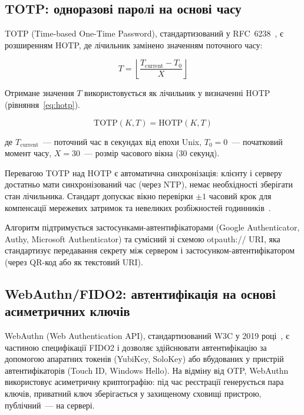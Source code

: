 \subsection{TOTP: одноразові паролі на основі часу}

TOTP (Time-based One-Time Password), стандартизований у RFC~6238~\cite{rfc6238},
є розширенням HOTP, де лічильник замінено значенням поточного часу:

\begin{equation}
T = \left\lfloor \frac{T_{\text{current}} - T_0}{X} \right\rfloor
\label{eq:totp_counter}
\end{equation}

Отримане значення $T$ використовується як лічильник у визначенні HOTP
(рівняння~\ref{eq:hotp}).

\begin{equation}
\text{TOTP}(K, T) = \text{HOTP}(K, T)
\label{eq:totp}
\end{equation}

де $T_{\text{current}}$~--- поточний час в секундах від епохи Unix,
$T_0 = 0$~--- початковий момент часу, $X = 30$~--- розмір часового вікна
(30 секунд).

Перевагою TOTP над HOTP є автоматична синхронізація: клієнту і серверу достатньо
мати синхронізований час (через NTP), немає необхідності зберігати стан лічильника.
Стандарт допускає вікно перевірки $\pm 1$ часовий крок для компенсації мережевих
затримок та невеликих розбіжностей годинників~\cite{rfc6238}.

Алгоритм підтримується застосунками-автентифікаторами (Google Authenticator,
Authy, Microsoft Authenticator) та сумісний зі схемою otpauth:// URI, яка стандартизує передавання секрету
між сервером і застосунком-автентифікатором (через QR-код або як текстовий URI).

\subsection{WebAuthn/FIDO2: автентифікація на основі асиметричних ключів}

WebAuthn (Web Authentication API), стандартизований W3C у 2019 році~\cite{w3c_webauthn2019},
є частиною специфікації FIDO2 і дозволяє здійснювати автентифікацію за допомогою
апаратних токенів (YubiKey, SoloKey) або вбудованих у пристрій автентифікаторів
(Touch ID, Windows Hello). На відміну від OTP, WebAuthn використовує асиметричну
криптографію: під час реєстрації генерується пара ключів, приватний ключ
зберігається у захищеному сховищі пристрою, публічний~--- на сервері.

